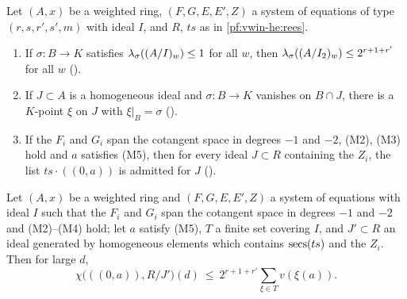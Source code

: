 \begin{lemma}\label{pf:vwin-he:aux}
Let $(A,x)$ be a weighted ring, $(F,G,E,E',Z)$ a system of equations of type $(r,s,r',s',m)$ with ideal $I$, and $R$,
$ts$ as in \cref{pf:vwin-he:rees}.
\begin{enumerate}[label=(\alph*)]
\item\label{pf:vwin-he:aux-loc2} If $\sigma:B\to K$ satisfies $\lambda_\sigma((A/I)_w)\le1$ for all $w$, then
$\lambda_\sigma((A/I_2)_w)\le2^{r+1+r'}$ for all $w$
().
\item\label{pf:vwin-he:aux-ext} If $J\subset A$ is a homogeneous ideal and $\sigma:B\to K$ vanishes on $B\cap J$,
there is a $K$-point $\xi$ on $J$ with $\xi|_B=\sigma$ ().
\item\label{pf:vwin-he:aux-adm} If the $F_i$ and $G_i$ span the cotangent space in degrees $-1$ and $-2$,
\textup{(M2)}, \textup{(M3)} hold and $a$ satisfies \textup{(M5)}, then for every ideal $J\subset R$ containing the
$Z_i$, the list $ts\cdot((0,a))$ is admitted for $J$ ().
\end{enumerate}
\end{lemma}

\begin{proposition}\label{pf:vwin-he:up}
Let $(A,x)$ be a weighted ring and $(F,G,E,E',Z)$ a system of equations with ideal $I$ such that the $F_i$ and $G_i$
span the cotangent space in degrees $-1$ and $-2$ and \textup{(M2)}--\textup{(M4)} hold; let $a$ satisfy
\textup{(M5)}, $T$ a finite set covering $I$, and $J'\subset R$ an ideal generated by homogeneous elements which
contains $\operatorname{secs}(ts)$ and the $Z_i$. Then for large $d$,
\[
 \chi\bigl(((0,a)),R/J'\bigr)(d)\ \le\ 2^{r+1+r'}\sum_{\xi\in T}v(\xi(a)).
\]
\end{proposition}

